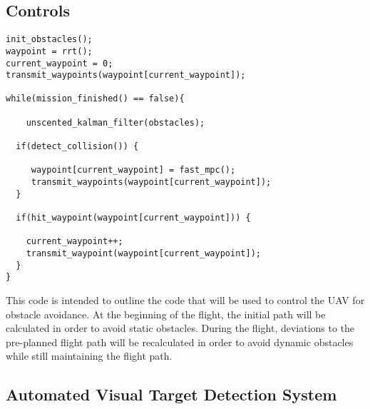 
\subsection{Controls}

\begin{artifacttable}
\end{artifacttable}

\begin{lstlisting}
init_obstacles();
waypoint = rrt();
current_waypoint = 0;
transmit_waypoints(waypoint[current_waypoint]);

while(mission_finished() == false){

	unscented_kalman_filter(obstacles);

  if(detect_collision()) {

	 waypoint[current_waypoint] = fast_mpc();
	 transmit_waypoints(waypoint[current_waypoint]);
  }

  if(hit_waypoint(waypoint[current_waypoint])) {

	current_waypoint++;
	transmit_waypoint(waypoint[current_waypoint]);
  }
}
\end{lstlisting}

This code is intended to outline the code that will be used to control the UAV for obstacle avoidance. At the beginning of the flight, the initial path will be calculated in order to avoid static obstacles. During the flight, deviations to the pre-planned flight path will be recalculated in order to avoid dynamic obstacles while still maintaining the flight path.

\subsection{Automated Visual Target Detection System}

\begin{artifacttable}
\end{artifacttable}

\lstset{language=Python}

